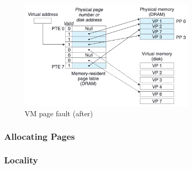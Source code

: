 \documentclass[../main.tex]{subfiles}
\begin{document}
\begin{figure}[H]
    \centering
    \includegraphics[width=0.75\textwidth]{graphics/Figure 4.7.png}
    \caption{VM page fault (after)}
    \label{fig:47}
\end{figure}

\subsubsection*{Allocating Pages}

\subsubsection*{Locality}
\end{document}
